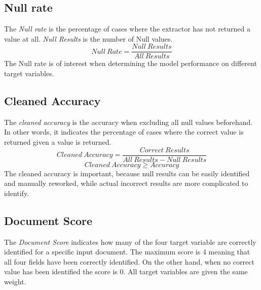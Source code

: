 \subsection{Null rate}
The \textit{Null rate} is the percentage of cases where the extractor has not returned a value at all. \textit{Null Results} is the number of Null values.
\[ Null \ Rate = \frac{Null \ Results}{All \ Results}\]
The Null rate is of interest when determining the model performance on different target variables.
\subsection{Cleaned Accuracy}
The \textit{cleaned accuracy} is the accuracy when excluding all null values beforehand. In other words, it indicates the percentage of cases where the correct value is returned given a value is returned.
\[ Cleaned \ Accuracy = \frac{Correct \ Results}{All \ Results - Null \ Results}\]
\[Cleaned \ Accuracy \geq Accuracy\]
The cleaned accuracy is important, because null results can be easily identified and manually reworked, while actual incorrect results are more complicated to identify.
\subsection{Document Score}
The \textit{Document Score} indicates how many of the four target variable are correctly identified for a specific input document.
The maximum score is 4 meaning that all four fields have been correctly identified. On the other hand, when no correct value has been identified
the score is 0. All target variables are given the same weight.